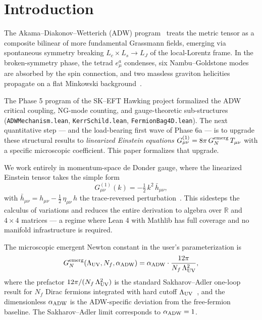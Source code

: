 \documentclass[aps,prd,twocolumn,showpacs,superscriptaddress,nofootinbib]{revtex4-2}
\newcommand{\GN}{G_{N}}
\newcommand{\GNemerg}{G_{N}^{\rm emerg}}
\newcommand{\Lambdauv}{\Lambda_{\rm UV}}
\newcommand{\Nf}{N_{f}}
\newcommand{\aADW}{\alpha_{\rm ADW}}
\begin{document}

\maketitle

\section{Introduction}
\label{sec:intro}

The Akama--Diakonov--Wetterich (ADW) program~\cite{Akama1978,Diakonov2011,
HebeckerWetterich2003,Wetterich2022,VladimirovDiakonov2012} treats the
metric tensor as a composite bilinear of more fundamental Grassmann fields,
emerging via spontaneous symmetry breaking $L_{c} \times L_{s} \to L_{J}$ of
the local-Lorentz frame. In the broken-symmetry phase, the
tetrad $e^{a}_{\mu}$ condenses, six Nambu--Goldstone modes are absorbed by
the spin connection, and two massless graviton helicities propagate
on a flat Minkowski background~\cite{Volovik2022Counting}.

The Phase 5 program of the SK--EFT Hawking project formalized the
ADW critical coupling, NG-mode counting, and gauge-theoretic
sub-structures (\texttt{ADWMechanism.lean}, \texttt{KerrSchild.lean},
\texttt{FermionBag4D.lean}). The next quantitative step --- and the
load-bearing first wave of Phase 6a --- is to upgrade these structural
results to \emph{linearized Einstein equations}
$G^{(1)}_{\mu\nu} = 8\pi\,\GN^{\rm emerg}\,T_{\mu\nu}$ with a
specific microscopic coefficient. This paper formalizes that
upgrade.

We work entirely in momentum-space de Donder gauge, where the
linearized Einstein tensor takes the simple form
\begin{equation}
\label{eq:gone-deDonder}
G^{(1)}_{\mu\nu}(k) = -\tfrac{1}{2}\,k^{2}\,\bar{h}_{\mu\nu},
\end{equation}
with $\bar{h}_{\mu\nu} = h_{\mu\nu} - \tfrac{1}{2}\,\eta_{\mu\nu}\,h$
the trace-reversed perturbation~\cite{Carroll2004,MTW1973}. This
sidesteps the calculus of variations and reduces the entire derivation
to algebra over $\mathbb{R}$ and $4\times 4$ matrices --- a regime
where Lean 4 with Mathlib has full coverage and no manifold
infrastructure is required.

The microscopic emergent Newton constant in the user's
parameterization is
\begin{equation}
\label{eq:GNemerg-def}
\GNemerg(\Lambdauv,\Nf,\aADW) =
   \aADW \cdot \frac{12\pi}{\Nf\,\Lambdauv^{2}},
\end{equation}
where the prefactor $12\pi/(\Nf\,\Lambdauv^{2})$ is the standard
Sakharov--Adler one-loop result for $\Nf$ Dirac fermions integrated
with hard cutoff $\Lambdauv$~\cite{Sakharov1968,Adler1982}, and
the dimensionless $\aADW$ is the ADW-specific deviation from the
free-fermion baseline. The Sakharov--Adler limit corresponds to
$\aADW = 1$.
\end{document}
